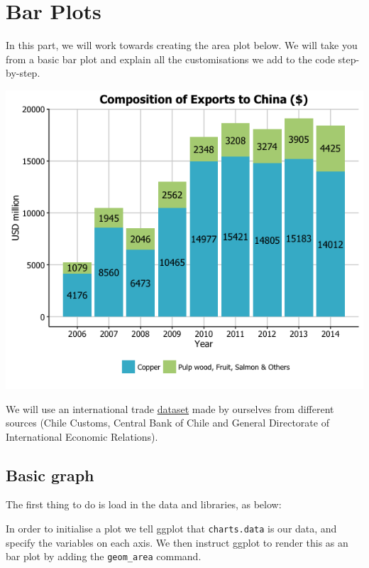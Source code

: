 \chapter{Bar Plots}\label{bar-plots}

In this part, we will work towards creating the area plot below. We will
take you from a basic bar plot and explain all the customisations we add
to the code step-by-step.

\begin{center}\includegraphics[width=0.55\linewidth]{0_all_posts_pdf/bar_final-1} \end{center}

We will use an international trade \href{http://pachamaltese.github.io/stats/trade-chile-china/copper-data-for-tutorial.csv}{dataset} made by ourselves from different sources (Chile Customs,
Central Bank of Chile and General Directorate of International Economic Relations).

\section{Basic graph}\label{basic-graph-2}

The first thing to do is load in the data and libraries, as below:

\begin{Shaded}
\begin{Highlighting}[]
\StringTok{ }\NormalTok{(}\NormalTok{)}
\end{Highlighting}
\end{Shaded}

In order to initialise a plot we tell ggplot that \texttt{charts.data}
is our data, and specify the variables on each axis. We then instruct
ggplot to render this as an bar plot by adding the \texttt{geom\_area}
command.

